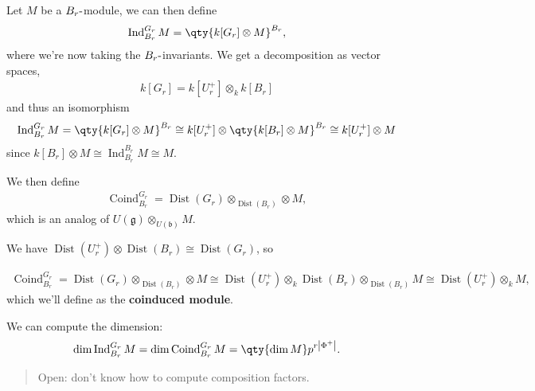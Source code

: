 Let \(M\) be a \(B_r{\hbox{-}}\)module, we can then define
\begin{align*}  
\operatorname{Ind}_{B_r}^{G_r}M = \qty{k[G_r] \otimes M }^{B_r}
,\end{align*}
where we're now taking the \(B_r{\hbox{-}}\)invariants. We get a
decomposition as vector spaces,
\begin{align*}  
k[G_r] = k[U_r^+] \otimes_k k[B_r]
\end{align*}
and thus an isomorphism
\begin{align*}  
\operatorname{Ind}_{B_r}^{G_r}M = \qty{k[G_r] \otimes M }^{B_r} 
\cong k[U_r^+] \otimes\qty{ k[B_r] \otimes M}^{B_r}
\cong k[U_r^+] \otimes M
\end{align*}
since
\(k[B_r]\otimes M \cong \operatorname{Ind}_{B_r}^{B_r} M \cong M\).

We then define
\begin{align*}  
\operatorname{Coind}_{B_r}^{G_r} = \operatorname{Dist}(G_r) \otimes_{\operatorname{Dist}(B_r)} \otimes M
,\end{align*}
which is an analog of
\(U({\mathfrak{g}})\otimes_{U({\mathfrak{b}})} M\).

We have
\(\operatorname{Dist}(U_r^+) \otimes\operatorname{Dist}(B_r) \cong \operatorname{Dist}(G_r)\),
so

\begin{align*}  
\operatorname{Coind}_{B_r}^{G_r} = \operatorname{Dist}(G_r) \otimes_{\operatorname{Dist}(B_r)} \otimes M
\cong
\operatorname{Dist}(U_r^+) \otimes_k \operatorname{Dist}(B_r) \otimes_{\operatorname{Dist}(B_r)} M 
\cong
\operatorname{Dist}(U_r^+) \otimes_k M
,\end{align*}
which we'll define as the \textbf{coinduced module}.

We can compute the dimension:
\begin{align*}  
\dim \operatorname{Ind}_{B_r}^{G_r} M = \dim \operatorname{Coind}_{B_r}^{G_r} M = \qty{\dim M} p^{r{\left\lvert {\Phi^+} \right\rvert}}
.\end{align*}

\begin{quote}
Open: don't know how to compute composition factors.
\end{quote}

